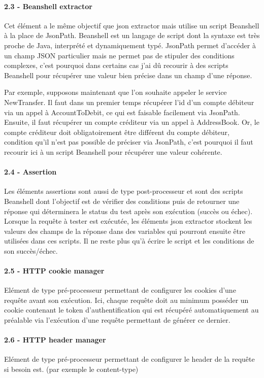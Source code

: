 	\paragraph{2.3 - Beanshell extractor}
	Cet élément a le même objectif que json extractor mais utilise un script Beanshell à la place de JsonPath. Beanshell est un langage de script dont la syntaxe est très proche de Java, interprété et dynamiquement typé. JsonPath permet d'accéder à un champ JSON particulier mais ne permet pas de stipuler des conditions complexes, c'est pourquoi dans certains cas j'ai dû recourir à des scripts Beanshell pour récupérer une valeur bien précise dans un champ d'une réponse.
	
	Par exemple, supposons maintenant que l'on souhaite appeler le service NewTransfer. Il faut dans un premier temps récupérer l'id d'un compte débiteur via un appel à AccountToDebit, ce qui est faisable facilement via JsonPath. Ensuite, il faut récupérer un compte créditeur via un appel à AddressBook. Or, le compte créditeur doit obligatoirement être différent du compte débiteur, condition qu'il n'est pas possible de préciser via JsonPath, c'est pourquoi il faut recourir ici à un script Beanshell pour récupérer une valeur cohérente.
	
	\paragraph{2.4 - Assertion}
	Les éléments assertions sont aussi de type post-processeur et sont des scripts Beanshell dont l'objectif est de vérifier des conditions puis de retourner une réponse qui déterminera le status du test après son exécution (succès ou échec). Lorsque la requête à tester est exécutée, les éléments json extractor stockent les valeurs des champs de la réponse dans des variables qui pourront ensuite être utilisées dans ces scripts. Il ne reste plus qu'à écrire le script et les conditions de son succès/échec.
	
	\paragraph{2.5 - HTTP cookie manager}
	Elément de type pré-processeur permettant de configurer les cookies d'une requête avant son exécution. Ici, chaque requête doit au minimum posséder un cookie contenant le token d'authentification qui est récupéré automatiquement au préalable via l'exécution d'une requête permettant de générer ce dernier.
	
	\paragraph{2.6 - HTTP header manager}
	Elément de type pré-processeur permettant de configurer le header de la requête si besoin est. (par exemple le content-type)
	

